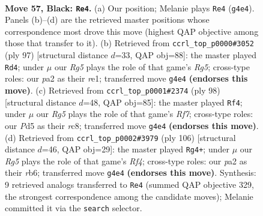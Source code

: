 \documentclass[11pt]{article}
\begin{document}
\clearpage

\begin{figure}[p]\centering
\begin{subfigure}{0.46\textwidth}\centering
\resizebox{\linewidth}{!}{%
\newchessgame
\chessboard[
  setfen={8/8/5pk1/3p4/3q2r1/5QP1/P5KP/8 b - - 9 57},
  showmover=false,
  pgfstyle=straightmove, color=movearrow, markmove={g4-e4}
]}
\caption{}
\end{subfigure}\hfill
\begin{subfigure}{0.46\textwidth}\centering
\resizebox{\linewidth}{!}{%
\newchessgame
\chessboard[
  setfen={8/3q2k1/5p2/8/6rp/5QP1/5P2/4R1K1 b - - 3 49},
  showmover=false,
  pgfstyle=straightmove, color=movearrow, markmove={g4-d4}
]}
\caption{}
\end{subfigure}
\\[4pt]
\begin{subfigure}{0.46\textwidth}\centering
\resizebox{\linewidth}{!}{%
\newchessgame
\chessboard[
  setfen={2r5/5Rpk/6q1/8/8/7P/8/5Q1K w - - 0 50},
  showmover=false,
  pgfstyle=straightmove, color=movearrow, markmove={f7-f4}
]}
\caption{}
\end{subfigure}\hfill
\begin{subfigure}{0.46\textwidth}\centering
\resizebox{\linewidth}{!}{%
\newchessgame
\chessboard[
  setfen={8/6k1/1r6/4q3/p1P2R1p/5Q1P/1p6/7K w - - 0 54},
  showmover=false,
  pgfstyle=straightmove, color=movearrow, markmove={f4-g4}
]}
\caption{}
\end{subfigure}
\caption{\textbf{Move 57, Black: \texttt{Re4}.} (a) Our position; Melanie plays \texttt{Re4} (\texttt{g4e4}). Panels (b)--(d) are the retrieved master positions whose correspondence most drove this move (highest QAP objective among those that transfer to it). (b) Retrieved from \texttt{ccrl\_top\_p0000\#3052} (ply 97) [structural distance $d$=33, QAP obj=88]: the master played \texttt{Rd4}; under $\mu$ our \emph{Rg5} plays the role of that game's \emph{Rg5}; cross-type roles: our \emph{p}a2 as their \emph{r}e1; transferred move \texttt{g4e4} \textbf{(endorses this move)}. (c) Retrieved from \texttt{ccrl\_top\_p0001\#2374} (ply 98) [structural distance $d$=48, QAP obj=85]: the master played \texttt{Rf4}; under $\mu$ our \emph{Rg5} plays the role of that game's \emph{Rf7}; cross-type roles: our \emph{P}d5 as their \emph{r}c8; transferred move \texttt{g4e4} \textbf{(endorses this move)}. (d) Retrieved from \texttt{ccrl\_top\_p0002\#3979} (ply 106) [structural distance $d$=46, QAP obj=29]: the master played \texttt{Rg4+}; under $\mu$ our \emph{Rg5} plays the role of that game's \emph{Rf4}; cross-type roles: our \emph{p}a2 as their \emph{r}b6; transferred move \texttt{g4e4} \textbf{(endorses this move)}. Synthesis: 9 retrieved analogs transferred to \texttt{Re4} (summed QAP objective 329, the strongest correspondence among the candidate moves); Melanie committed it via the \texttt{search} selector.}
\label{fig:thought-m113}
\end{figure}
\end{document}
